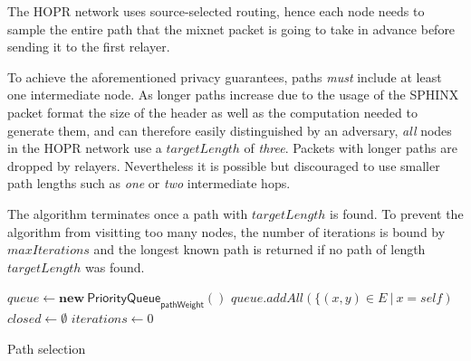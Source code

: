 The HOPR network uses source-selected routing, hence each node needs to sample the entire path that the mixnet packet is going to take in advance before sending it to the first relayer.

To achieve the aforementioned privacy guarantees, paths \textit{must} include at least one intermediate node. As longer paths increase due to the usage of the SPHINX packet format the size of the header as well as the computation needed to generate them, and can therefore easily distinguished by an adversary, \textit{all} nodes in the HOPR network use a $targetLength$ of \textit{three}. Packets with longer paths are dropped by relayers. Nevertheless it is possible but discouraged to use smaller path lengths such as \textit{one} or \textit{two} intermediate hops.

The algorithm terminates once a path with $targetLength$ is found. To prevent the algorithm from visitting too many nodes, the number of iterations is bound by $maxIterations$ and the longest known path is returned if no path of length $targetLength$ was found.

\begin{algorithm}[H]
    \SetAlgoNoLine
    \DontPrintSemicolon
    \;
    $queue \leftarrow \mathbf{new} \ \mathsf{PriorityQueue}_{\textsf{pathWeight}}()$\;
    $queue.addAll(\{ (x,y) \in E \ | \ x = self)$\;
    $closed \leftarrow \emptyset$\;
    $iterations \leftarrow 0$\;
    \;
    \caption{Path selection}
\end{algorithm}
